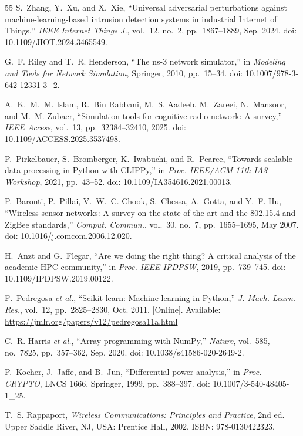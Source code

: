 \documentclass[conference]{IEEEtran}
\begin{document}
\begin{enumerate}
\begin{thebibliography}{55}
S.~Zhang, Y.~Xu, and X.~Xie, ``Universal adversarial perturbations against machine-learning-based intrusion detection systems in industrial Internet of Things,'' \textit{IEEE Internet Things J.}, vol.~12, no.~2, pp.~1867--1889, Sep. 2024. doi: 10.1109/JIOT.2024.3465549.

G.~F. Riley and T.~R. Henderson, ``The ns-3 network simulator,'' in \textit{Modeling and Tools for Network Simulation}, Springer, 2010, pp.~15--34. doi: 10.1007/978-3-642-12331-3\_2.

A.~K.~M.~M. Islam, R.~Bin Rabbani, M.~S. Aadeeb, M.~Zareei, N.~Mansoor, and M.~M. Zubaer, ``Simulation tools for cognitive radio network: A survey,'' \textit{IEEE Access}, vol.~13, pp.~32384--32410, 2025. doi: 10.1109/ACCESS.2025.3537498.

P.~Pirkelbauer, S.~Bromberger, K.~Iwabuchi, and R.~Pearce, ``Towards scalable data processing in Python with CLIPPy,'' in \textit{Proc. IEEE/ACM 11th IA3 Workshop}, 2021, pp.~43--52. doi: 10.1109/IA354616.2021.00013.

P.~Baronti, P.~Pillai, V.~W.~C. Chook, S.~Chessa, A.~Gotta, and Y.~F. Hu, ``Wireless sensor networks: A survey on the state of the art and the 802.15.4 and ZigBee standards,'' \textit{Comput. Commun.}, vol.~30, no.~7, pp.~1655--1695, May 2007. doi: 10.1016/j.comcom.2006.12.020.

H.~Anzt and G.~Flegar, ``Are we doing the right thing? A critical analysis of the academic HPC community,'' in \textit{Proc. IEEE IPDPSW}, 2019, pp.~739--745. doi: 10.1109/IPDPSW.2019.00122.

F.~Pedregosa \textit{et al.}, ``Scikit-learn: Machine learning in Python,'' \textit{J. Mach. Learn. Res.}, vol.~12, pp.~2825--2830, Oct. 2011. [Online]. Available: \url{https://jmlr.org/papers/v12/pedregosa11a.html}

C.~R. Harris \textit{et al.}, ``Array programming with NumPy,'' \textit{Nature}, vol.~585, no.~7825, pp.~357--362, Sep. 2020. doi: 10.1038/s41586-020-2649-2.

P.~Kocher, J.~Jaffe, and B.~Jun, ``Differential power analysis,'' in \textit{Proc. CRYPTO}, LNCS 1666, Springer, 1999, pp.~388--397. doi: 10.1007/3-540-48405-1\_25.

T.~S. Rappaport, \textit{Wireless Communications: Principles and Practice}, 2nd ed. Upper Saddle River, NJ, USA: Prentice Hall, 2002, ISBN: 978-0130422323.


\end{thebibliography}
\end{enumerate}
\end{document}

